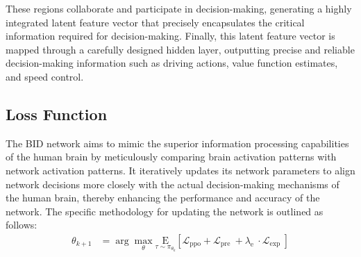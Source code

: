 These regions collaborate and participate in decision-making, generating a highly integrated latent feature vector that precisely encapsulates the critical information required for decision-making. 
Finally, this latent feature vector is mapped through a carefully designed hidden layer, outputting precise and reliable decision-making information such as driving actions, value function estimates, and speed control.


\subsection{Loss Function}
The BID network aims to mimic the superior information processing capabilities of the human brain by meticulously comparing brain activation patterns with network activation patterns. 
It iteratively updates its network parameters to align network decisions more closely with the actual decision-making mechanisms of the human brain, thereby enhancing the performance and accuracy of the network. 
The specific methodology for updating the network is outlined as follows:
\begin{align}
	\theta_{k+1} & = \arg \max _{\theta} \underset{\tau \sim \pi_{\theta_{k}}}{\mathrm{E}}\left[\mathcal{L}_{\mathrm{ppo}}+\mathcal{L}_{\text {pre }}+\lambda_{\text {e }} \cdot \mathcal{L}_{\text {exp }}\right]
\end{align}



